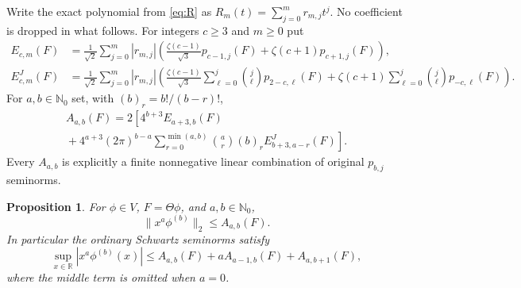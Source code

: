 \documentclass[11pt]{article}
\newtheorem{proposition}[theorem]{Proposition}
\newcommand{\R}{\mathbb R}
\newcommand{\N}{\mathbb N}
\begin{document}
Write the exact polynomial from \eqref{eq:R} as
$R_m(t)=\sum_{j=0}^m r_{m,j}t^j$. No coefficient is dropped in what
follows. For integers $c\geq3$ and $m\geq0$ put
\begin{align}
 E_{c,m}(F)&=\frac1{\sqrt2}\sum_{j=0}^m|r_{m,j}|
 \left(\frac{\zeta(c-1)}{\sqrt3}p_{c-1,j}(F)
                      +\zeta(c+1)p_{c+1,j}(F)\right),
                     \label{eq:E}\\
 E^J_{c,m}(F)&=\frac1{\sqrt2}\sum_{j=0}^m|r_{m,j}|
 \left(\frac{\zeta(c-1)}{\sqrt3}
                     \sum_{\ell=0}^j\binom j\ell p_{2-c,\ell}(F)
       +\zeta(c+1)\sum_{\ell=0}^j\binom j\ell p_{-c,\ell}(F)\right).
                     \label{eq:EJ}
\end{align}
For $a,b\in\N_0$ set, with $(b)_r=b!/(b-r)!$,
\begin{multline}\label{eq:A}
 A_{a,b}(F)=2\left[4^{b+3}E_{a+3,b}(F)\right.\\
 \left.{}+4^{a+3}(2\pi)^{b-a}
 \sum_{r=0}^{\min(a,b)}\binom ar(b)_rE^J_{b+3,a-r}(F)\right].
\end{multline}
Every $A_{a,b}$ is explicitly a finite nonnegative linear combination
of original $p_{b,j}$ seminorms.

\begin{proposition}\label{prop:inverse}
For $\phi\in V$, $F=\Theta\phi$, and $a,b\in\N_0$,
\begin{equation}\label{eq:L2-inverse}
 \|x^a\phi^{(b)}\|_2\leq A_{a,b}(F).
\end{equation}
In particular the ordinary Schwartz seminorms satisfy
\begin{equation}\label{eq:sup-inverse}
 \sup_{x\in\R}|x^a\phi^{(b)}(x)|
 \leq A_{a,b}(F)+aA_{a-1,b}(F)+A_{a,b+1}(F),
\end{equation}
where the middle term is omitted when $a=0$.
\end{proposition}
\end{document}
